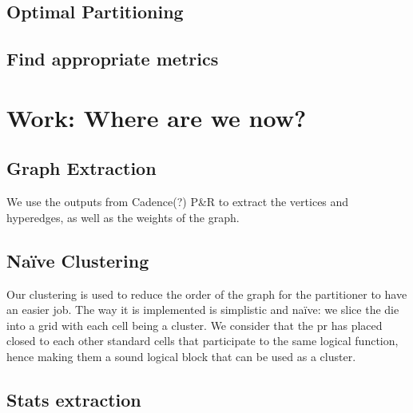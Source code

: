 \documentclass[11pt,a4paper]{article}
\theoremstyle{customdef}
\begin{document}
\subsection{Optimal Partitioning}

\subsection{Find appropriate metrics}





\section{Work: Where are we now?}

\subsection{Graph Extraction}
We use the outputs from Cadence(?) P\&R to extract the vertices and hyperedges, as well as the weights of the graph.

\subsection{Naïve Clustering}
Our clustering is used to reduce the order of the graph for the partitioner to have an easier job.
The way it is implemented is simplistic and naïve: we slice the die into a grid with each cell being a cluster.
We consider that the \gls{pr} has placed closed to each other standard cells that participate to the same logical function, hence making them a sound logical block that can be used as a cluster.

\subsection{Stats extraction}
\end{document}
